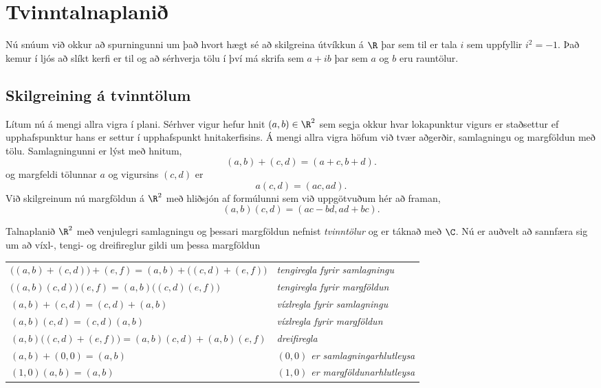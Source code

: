 \section{Tvinntalnaplanið}

Nú snúum við okkur að spurningunni um það  hvort hægt sé að skilgreina
útvíkkun  á $\R$ þar sem til er tala $i$ sem uppfyllir $i^2=-1$.
Það kemur í ljós að slíkt kerfi er til og að sérhverja tölu í því má
skrifa sem $a+ib$ þar sem $a$ og $b$ eru rauntölur.


\subsection*{Skilgreining á tvinntölum}


Lítum nú á mengi allra vigra í plani.  Sérhver vigur hefur hnit
$(a,b)\in \R^2$ sem segja okkur hvar lokapunktur vigurs er staðsettur ef
upphafspunktur hans er settur í upphafspunkt hnitakerfisins.
Á mengi allra vigra höfum við tvær aðgerðir, samlagningu og margföldun
með tölu.  Samlagningunni er lýst með hnitum, 
$$(a,b)+(c,d)=(a+c,b+d).
$$  
og margfeldi tölunnar $a$ og vigursins $(c,d)$ er
$$
a(c,d)=(ac,ad).
$$ 
Við skilgreinum nú margföldun á $\R^2$ með hliðsjón af formúlunni sem við
uppgötvuðum hér að framan, 
$$
(a,b)(c,d)=(ac-bd,ad+bc).
$$


Talnaplanið $\R^2$ með venjulegri samlagningu og þessari margföldun
nefnist {\it tvinntölur } og er táknað með $\C$.  Nú er auðvelt að
sannfæra  sig um að víxl-, tengi- og dreifireglur gildi um
þessa margföldun
\begin{center}
\begin{tabular}{ll}
$\big((a,b)+(c,d)\big)+(e,f)=(a,b)+\big((c,d)+(e,f)\big)$
&{\it tengiregla fyrir samlagningu}\\
$\big((a,b)(c,d)\big)(e,f)=(a,b)\big((c,d)(e,f)\big)$
&{\it tengiregla fyrir margföldun}\\
$(a,b)+(c,d)=(c,d)+(a,b)$ 
&{\it víxlregla fyrir samlagningu} \\
$(a,b)(c,d)=(c,d)(a,b)$ 
&{\it víxlregla fyrir margföldun} \\
$(a,b)\big((c,d)+(e,f)\big) =(a,b)(c,d)+(a,b)(e,f)$
&{\it dreifiregla}\\
$(a,b)+(0,0)=(a,b)$
&{\it $(0,0)$ er samlagningarhlutleysa}\\
$(1,0)(a,b)=(a,b)$
&{\it $(1,0)$ er margföldunarhlutleysa}\\
\end{tabular}
\end{center}



